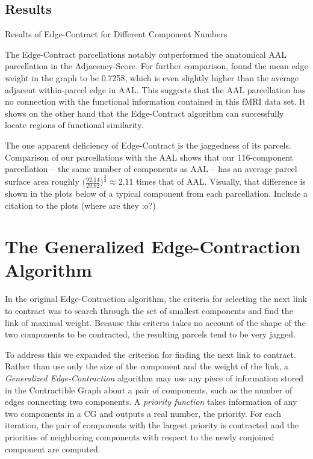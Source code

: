 \subsection{Results}

\begin{table}
\caption{Results of Edge-Contract for Different Component Numbers}
\label{4_ec}
\end{table}

The Edge-Contract parcellations notably outperformed the anatomical AAL
parcellation in the Adjacency-Score. For further comparison, found the
mean edge weight in the graph to be 0.7258, which is even slightly
higher than the average adjacent within-parcel edge in AAL. This
suggests that the AAL parcellation has no connection with the functional
information contained in this fMRI data set. It shows on the other
hand that the Edge-Contract algorithm can successfully locate regions of
functional similarity.

The one apparent deficiency of Edge-Contract is the jaggedness of its
parcels. Comparison of our parcellations with the AAL shows that our
116-component parcellation -- the same number of components as AAL --
has an average parcel surface area roughly
$\big( \frac{92.14}{29.62} \big)^{\frac{2}{3} }\approx 2.11$ times
that of AAL. Visually, that difference is shown in the plots below of
a typical component from each parcellation. {\color{red}Include 
a citation to the plots (where are they :o?) }


\section{The Generalized Edge-Contraction Algorithm}

In the original Edge-Contraction algorithm, the criteria for selecting
the next link to contract was to search through the set of smallest
components and find the link of maximal weight. Because this criteria
takes no account of the shape of the two components to be contracted,
the resulting parcels tend to be very jagged.

To address this we expanded the criterion for finding the next link
to contract. Rather than use only the size of the component and the
weight of the link, a \textit{Generalized Edge-Contraction} algorithm
may use any piece of information stored in the Contractible Graph about
a pair of components, such as the number of edges connecting two
components. A \textit{priority function} takes information of any two
components in a CG and outputs a real number, the priority. For each
iteration, the pair of components with the largest priority is
contracted and the priorities of neighboring components with respect
to the newly conjoined component are computed.

